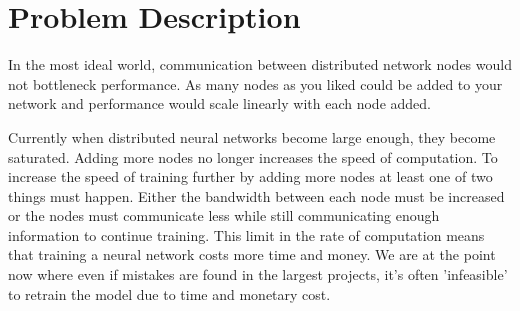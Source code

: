 \clearpage
\section{Problem Description}

In the most ideal world, communication between distributed network nodes would
not bottleneck performance. As many nodes as you liked could be added to your
network and performance would scale linearly with each node added.



Currently when distributed neural networks become large enough, they become
saturated. Adding more nodes no longer increases the speed of computation. To
increase the speed of training further by adding more nodes at least one of two
things must happen. Either the bandwidth between each node must be increased or
the nodes must communicate less while still communicating enough information to
continue training.\cite{li2014communication}\cite{SunTimeDataflow} This limit in
the rate of computation means that training a neural network costs more time and
money. We are at the point now where even if mistakes are found in the largest
projects, it's often 'infeasible' to retrain the model due to time and monetary
cost. \cite{fewshowlearners2020gpt}

